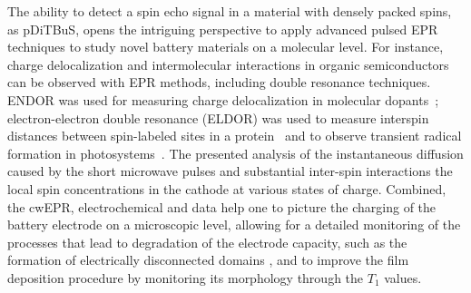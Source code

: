 The ability to detect a spin echo signal in a material with densely packed spins, as pDiTBuS, opens the intriguing perspective to apply advanced pulsed EPR techniques to study novel battery materials on a molecular level. For instance, charge delocalization and intermolecular interactions in organic semiconductors can be observed with EPR methods,  including double resonance techniques\cite{Tait2021}. ENDOR was used for measuring charge delocalization in molecular  dopants~\cite{arvind2020_jpcb}; electron-electron double resonance (ELDOR) was used to measure interspin distances between spin-labeled sites in a protein~\cite{jeschke2012_annrevphyschem} and to observe transient radical formation in photosystems~\cite{Bittl2005}. The presented analysis of the instantaneous diffusion caused by the short microwave pulses and substantial inter-spin interactions  the local spin concentrations in the cathode at various states of charge. Combined, the cwEPR, electrochemical and  data help one to picture the charging of the battery electrode on a microscopic level, allowing for a detailed monitoring of the processes that lead to degradation of the electrode capacity, such as the formation of electrically disconnected domains , and to improve the film deposition procedure by monitoring its morphology through the $T_1$ values.





